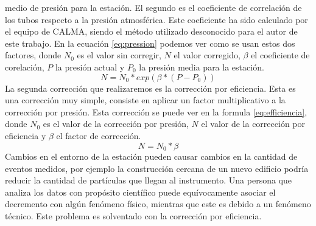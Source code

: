 		medio de presión para la estación. El segundo es el coeficiente de correlación de los tubos respecto a la presión atmosférica. Este
		coeficiente ha sido calculado por el equipo de CALMA, siendo el método utilizado desconocido para el autor de este trabajo. En la
		ecuación \ref{eq:pression} podemos ver como se usan estos dos factores, donde $N_0$ es el valor sin corregir, $N$ el valor corregido,
		$\beta$ el coeficiente de corelación, $P$ la presión actual y $P_0$ la presión media para la estación.
		\begin{equation}\label{eq:pression}
		  N=N_0*exp(\beta*(P-P_0))
		\end{equation}
		La segunda corrección que realizaremos es la corrección por eficiencia. Esta es una corrección muy simple, consiste en aplicar un
		factor multiplicativo a la corrección por presión. Esta corrección se puede ver en la formula \ref{eq:efficiencia}, donde $N_0$ es el
		valor de la corrección por presión, $N$ el valor de la corrección por eficiencia y $\beta$ el factor de corrección. 
		\begin{equation}\label{eq:efficiencia}
		  N=N_0*\beta
		\end{equation}
		Cambios en el entorno de la estación pueden causar cambios en la cantidad de eventos medidos, por ejemplo la construcción cercana de
		un nuevo edificio podría reducir la cantidad de partículas que llegan al instrumento. Una persona que analiza los datos con propósito
		científico puede equívocamente asociar el decremento con algún fenómeno físico, mientras que este es debido a un fenómeno técnico.
		Este problema es solventado con la corrección por eficiencia.   

